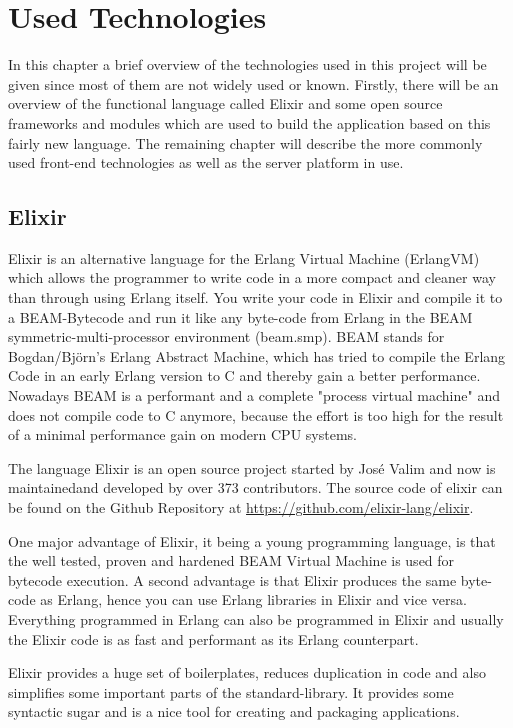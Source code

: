 \chapter{Used Technologies} \label{used_tec}
In this chapter a brief overview of the technologies used in this project will be given since most of them are not widely used or known. Firstly, there will be an overview of the functional language called Elixir and some open source frameworks and modules which are used to build the application based on this fairly new language. The remaining chapter will describe the more commonly used front-end technologies as well as the server platform in use. 

\section{Elixir} \label{elixir_erlangVM}
Elixir is an alternative language for the Erlang Virtual Machine (ErlangVM) which allows the programmer to write code in a more compact and cleaner way than through using Erlang itself. You write your code in Elixir and compile it to a BEAM-Bytecode and run it like any byte-code from Erlang in the BEAM symmetric-multi-processor environment (beam.smp). BEAM stands for Bogdan/Björn's Erlang Abstract Machine, which has tried to compile the Erlang Code in an early Erlang version to C and thereby gain a better performance. Nowadays BEAM is a performant and a complete "process virtual machine" and does not compile code to C anymore, because the effort is too high for the result of a minimal performance gain on modern CPU systems.

The language Elixir is an open source project started by Jos\'e Valim and now is maintainedand developed by over 373 contributors. The source code of elixir can be found on the Github Repository at \url{https://github.com/elixir-lang/elixir}.

One major advantage of Elixir, it being a young programming language, is that the well tested, proven and hardened BEAM Virtual Machine is used for bytecode execution. A second advantage is that Elixir produces the same byte-code as Erlang, hence you can use Erlang libraries in Elixir and vice versa. Everything programmed in Erlang can also be programmed in Elixir and usually the Elixir code is as fast and performant as its Erlang counterpart.

Elixir provides a huge set of boilerplates, reduces duplication in code and also simplifies some important parts of the standard-library. It provides some syntactic sugar and is a nice tool for creating and packaging applications.


